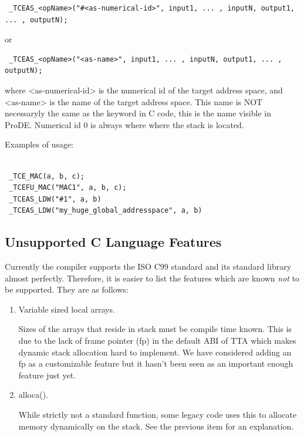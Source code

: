\documentclass[twoside]{tceusermanual}
\begin{document}
\begin{verbatim}
 _TCEAS_<opName>("#<as-numerical-id>", input1, ... , inputN, output1, ... , outputN);
\end{verbatim}

or

\begin{verbatim}
 _TCEAS_<opName>("<as-name>", input1, ... , inputN, output1, ... , outputN);
\end{verbatim}

where <as-numerical-id> is the numerical id  of the target address space, 
and <as-name> is the name of the target address space.
This name is NOT necessaryly the same as the keyword in C code,
this is the name visible in ProDE. Numerical id 0 is always where
where the stack is located.

Examples of usage:

\begin{verbatim}
 
 _TCE_MAC(a, b, c);
 _TCEFU_MAC("MAC1", a, b, c);
 _TCEAS_LDW("#1", a, b)
 _TCEAS_LDW("my_huge_global_addresspace", a, b)

\end{verbatim}


\subsection{Unsupported C Language Features}

Currently the compiler supports the ISO C99 standard and its standard library 
almost perfectly. Therefore, it is easier to list the features which are 
known \textit{not} to be supported. They are as follows:

\begin{enumerate}
 \item Variable sized local arrays.

Sizes of the arrays that reside in stack must be compile time known. This is
due to the lack of frame pointer (fp) in the default ABI of TTA which makes dynamic
stack allocation hard to implement. We have considered adding an fp as a customizable
feature but it hasn't been seen as an important enough feature just yet.

\item alloca().

While strictly not a standard function, some legacy code uses this to allocate
memory dynamically on the stack. See the previous item for an explanation.

\end{enumerate}
\end{document}
